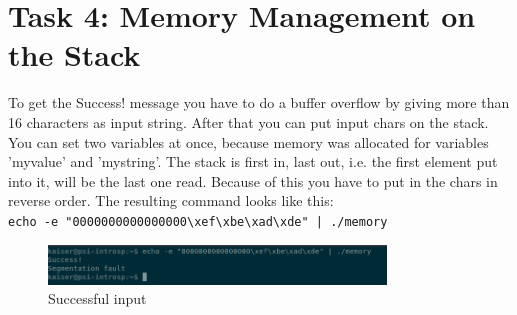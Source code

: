 \section{Task 4: Memory Management on the Stack}

To get the Success! message you have to do a buffer overflow by giving more than 16 characters as input string. After that you can put input chars on the stack. You can set two variables at once, because memory was allocated for variables 'myvalue' and 'mystring'. The stack is first in, last out, i.e. the first element put into it, will be the last one read. Because of this you have to put in the chars in reverse order. The resulting command looks like this:\\

\verb+echo -e "0000000000000000\xef\xbe\xad\xde" | ./memory+


\begin{figure}[ht]
	\centering
	\includegraphics[width=0.8\textwidth]{Assignment0x01/image/success.png}
	\caption{Successful input}
\end{figure}

